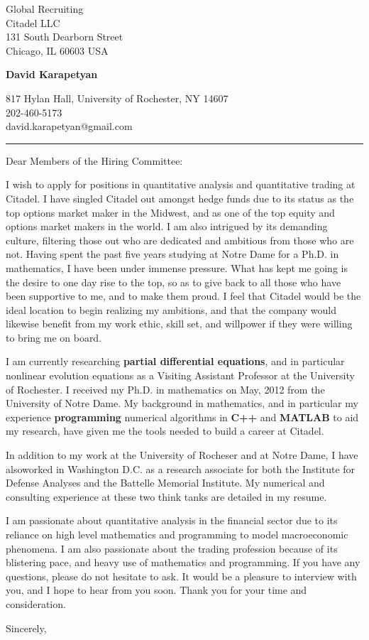\documentclass[12pt]{letter}
\date{\vspace{0.5cm}\flushleft}
\begin{document}
\begin{letter}{Global Recruiting \\
Citadel LLC \\
131 South Dearborn Street  \\
Chicago, IL 60603 USA 
}
\begin{center}
{\bf {\Large David Karapetyan}}
\end{center}

\begin{center}
{817 Hylan Hall, University of Rochester, NY 14607  \\ 
202-460-5173 \\  david.karapetyan@gmail.com
}
\end{center}
\hrule

\opening{Dear Members of the Hiring Committee:\\}
%
%
I wish to apply for positions in quantitative analysis and quantitative
trading at Citadel. I have singled Citadel out amongst hedge funds due to its status as the top options market maker in the Midwest, and as one of the top equity and options market makers in the world. I am also intrigued by its demanding culture, filtering those out who are dedicated and ambitious from those who are not. Having spent the past five years studying at Notre Dame for a Ph.D. in mathematics, I have been under immense pressure. What has kept me going is the desire to one day rise to the top, so as to give back to all those who have been supportive to me, and to make them proud. I feel that Citadel would be the ideal location to begin realizing my ambitions, and that the company would likewise benefit from my work ethic, skill set, and willpower if they were willing to bring me on board. 

I am currently researching \textbf{partial differential equations}, and in particular nonlinear evolution equations as a Visiting Assistant Professor at the University of Rochester. I received my Ph.D. in mathematics on May, 2012 from the University of Notre Dame. My
background in mathematics, and in particular my experience
\textbf{programming} numerical algorithms in \textbf{C++} and \textbf{MATLAB}
to aid my research, have given me the tools needed to build a career at Citadel.

In addition to my work at the University of Rocheser and at Notre Dame, I have alsoworked in Washington D.C. as a research
associate for both the Institute for Defense Analyses and the Battelle Memorial
Institute. My numerical and consulting experience at these two think tanks are
detailed in my resume. 

I am passionate about quantitative analysis in the financial sector due to its reliance on high level mathematics and programming to model macroeconomic phenomena. I am also passionate about the trading profession because of its blistering pace, and heavy use of mathematics and programming. 
If you have any questions, please do not hesitate to ask. It would be a
pleasure to interview with you, and I hope to hear from you soon. Thank you for
your time and consideration. 

\closing{Sincerely,}


\end{letter}
\end{document}
